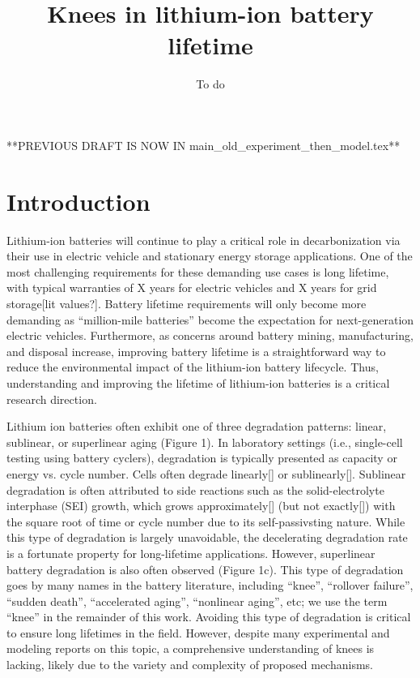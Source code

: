 \documentclass{article}
\title{Knees in lithium-ion battery lifetime}
\author{To do}
\date{}
\begin{document}
\maketitle

**PREVIOUS DRAFT IS NOW IN main\_old\_experiment\_then\_model.tex**

\section{Introduction}

Lithium-ion batteries will continue to play a critical role in decarbonization via their use in electric vehicle and stationary energy storage applications. One of the most challenging requirements for these demanding use cases is long lifetime, with typical warranties of X years for electric vehicles and X years for grid storage[lit values?]. Battery lifetime requirements will only become more demanding as “million-mile batteries” become the expectation for next-generation electric vehicles. Furthermore, as concerns around battery mining, manufacturing, and disposal increase, improving battery lifetime is a straightforward way to reduce the environmental impact of the lithium-ion battery lifecycle. Thus, understanding and improving the lifetime of lithium-ion batteries is a critical research direction.

Lithium ion batteries often exhibit one of three degradation patterns: linear, sublinear, or superlinear aging (Figure 1). In laboratory settings (i.e., single-cell testing using battery cyclers), degradation is typically presented as capacity or energy vs. cycle number. Cells often degrade linearly[] or sublinearly[]. Sublinear degradation is often attributed to side reactions such as the solid-electrolyte interphase (SEI) growth, which grows approximately[] (but not exactly[]) with the square root of time or cycle number due to its self-passivsting nature. While this type of degradation is largely unavoidable, the decelerating degradation rate is a fortunate property for long-lifetime applications. However, superlinear battery degradation is also often observed (Figure 1c). This type of degradation goes by many names in the battery literature, including “knee”, “rollover failure”, “sudden death”, “accelerated aging”, “nonlinear aging”, etc; we use the term “knee” in the remainder of this work. Avoiding this type of degradation is critical to ensure long lifetimes in the field. However, despite many experimental and modeling reports on this topic, a comprehensive understanding of knees is lacking, likely due to the variety and complexity of proposed mechanisms.
\end{document}
